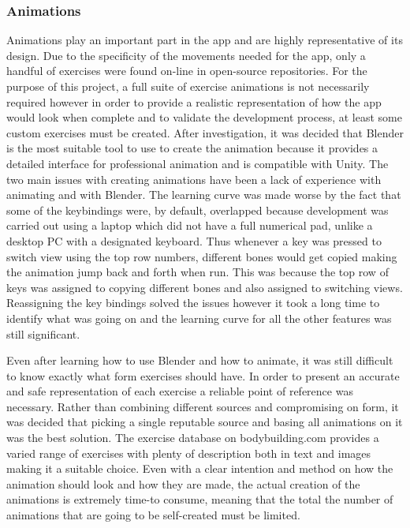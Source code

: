 \documentclass{l4proj}
\begin{document}
\subsubsection{Animations}
Animations play an important part in the app and are highly representative of its design. Due to the specificity of the movements needed for the app, only a handful of exercises were found on-line in open-source repositories. For the purpose of this project, a full suite of exercise animations is not necessarily required however in order to provide a realistic representation of how the app would look when complete and to validate the development process, at least some custom exercises must be created. After investigation, it was decided that Blender is the most suitable tool to use to create the animation because it provides a detailed interface for professional animation and is compatible with Unity. The two main issues with creating animations have been a lack of experience with animating and with Blender. The learning curve was made worse by the fact that some of the keybindings were, by default, overlapped because development was carried out using a laptop which did not have a full numerical pad, unlike a desktop PC with a designated keyboard. Thus whenever a key was pressed to switch view using the top row numbers, different bones would get copied making the animation jump back and forth when run. This was because the top row of keys was assigned to copying different bones and also assigned to switching views. Reassigning the key bindings solved the issues however it took a long time to identify what was going on and the learning curve for all the other features was still significant.

Even after learning how to use Blender and how to animate, it was still difficult to know exactly what form exercises should have. In order to present an accurate and safe representation of each exercise a reliable point of reference was necessary. Rather than combining different sources and compromising on form, it was decided that picking a single reputable source and basing all animations on it was the best solution.  The exercise database on bodybuilding.com provides a varied range of exercises with plenty of description both in text and images making it a suitable choice. Even with a clear intention and method on how the animation should look and how they are made, the actual creation of the animations is extremely time-to consume, meaning that the total the number of animations that are going to be self-created must be limited.
\end{document}
